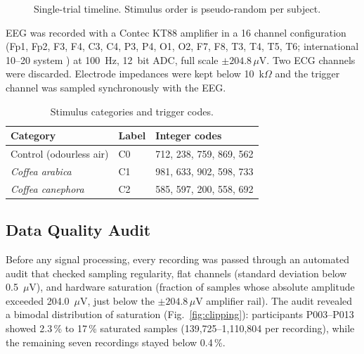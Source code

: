 \documentclass[conference]{IEEEtran}
\begin{document}
\begin{figure}[ht]
  \centering
  \caption{Single-trial timeline. Stimulus order is pseudo-random per subject.}
  \label{fig:protocol}
\end{figure}

EEG was recorded with a Contec KT88 amplifier in a 16 channel configuration (Fp1, Fp2, F3, F4, C3, C4, P3, P4, O1, O2, F7, F8, T3, T4, T5, T6; international 10--20 system \cite{jasper1958}) at 100~Hz, 12~bit ADC, full scale $\pm 204.8\,\mu$V. Two ECG channels were discarded. Electrode impedances were kept below 10~k$\Omega$ and the trigger channel was sampled synchronously with the EEG.

\begin{table}[ht]
  \centering
  \caption{Stimulus categories and trigger codes.}
  \label{tab:codes}
  \footnotesize
  \begin{tabular}{p{} p{} p{}}
    \toprule
    \textbf{Category} & \textbf{Label} & \textbf{Integer codes} \\
    \midrule
    Control (odourless air) & C0 & 712, 238, 759, 869, 562 \\
    \textit{Coffea arabica}    & C1 & 981, 633, 902, 598, 733 \\
    \textit{Coffea canephora}  & C2 & 585, 597, 200, 558, 692 \\
    \bottomrule
  \end{tabular}
\end{table}

\subsection{Data Quality Audit}
Before any signal processing, every recording was passed through an automated audit that checked sampling regularity, flat channels (standard deviation below 0.5~$\mu$V), and hardware saturation (fraction of samples whose absolute amplitude exceeded 204.0~$\mu$V, just below the $\pm 204.8\,\mu$V amplifier rail). The audit revealed a bimodal distribution of saturation (Fig.~\ref{fig:clipping}): participants P003--P013 showed 2.3\,\% to 17\,\% saturated samples (139{,}725--1{,}110{,}804 per recording), while the remaining seven recordings stayed below 0.4\,\%.
\end{document}
